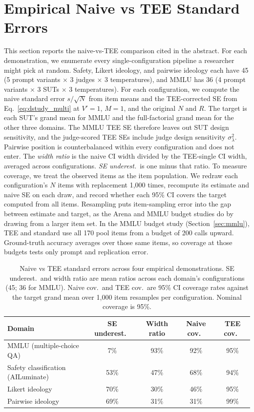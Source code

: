 \clearpage

\section{Empirical Naive vs TEE Standard Errors}
\label{si:naive_vs_tee}

This section reports the naive-vs-TEE comparison cited in the abstract. For each demonstration, we enumerate every single-configuration pipeline a researcher might pick at random. Safety, Likert ideology, and pairwise ideology each have 45 (5 prompt variants $\times$ 3 judges $\times$ 3 temperatures), and MMLU has 36 (4 prompt variants $\times$ 3 SUTs $\times$ 3 temperatures). For each configuration, we compute the naive standard error $s/\sqrt{N}$ from item means and the TEE-corrected SE from Eq.~\ref{eq:dstudy_multi} at $V' = 1$, $M = 1$, and the original $N$ and $R$. The target is each SUT's grand mean for MMLU and the full-factorial grand mean for the other three domains. The MMLU TEE SE therefore leaves out SUT design sensitivity, and the judge-scored TEE SEs include judge design sensitivity $\sigma^2_\lambda$. Pairwise position is counterbalanced within every configuration and does not enter. The \emph{width ratio} is the naive CI width divided by the TEE-single CI width, averaged across configurations. \emph{SE underest.}\ is one minus that ratio. To measure coverage, we treat the observed items as the item population. We redraw each configuration's $N$ items with replacement 1,000 times, recompute its estimate and naive SE on each draw, and record whether each 95\% CI covers the target computed from all items. Resampling puts item-sampling error into the gap between estimate and target, as the Arena and MMLU budget studies do by drawing from a larger item set. In the MMLU budget study (Section~\ref{sec:mmlu}), TEE and standard use all 170 pool items from a budget of 200 calls upward. Ground-truth accuracy averages over those same items, so coverage at those budgets tests only prompt and replication error.

\begin{table}[h]
\centering
\small
\caption{Naive vs TEE standard errors across four empirical demonstrations. SE underest.\ and width ratio are mean ratios across each domain's configurations (45; 36 for MMLU). Naive cov.\ and TEE cov.\ are 95\% CI coverage rates against the target grand mean over 1,000 item resamples per configuration. Nominal coverage is 95\%.}
\label{tab:naive_vs_tee}
\begin{tabular}{lcccc}
\toprule
Domain & SE underest.\ & Width ratio & Naive cov.\ & TEE cov.\ \\
\midrule
MMLU (multiple-choice QA)          & 7\%  & 93\% & 92\% & 95\% \\
Safety classification (AILuminate) & 53\% & 47\% & 68\% & 94\% \\
Likert ideology                    & 70\% & 30\% & 46\% & 95\% \\
Pairwise ideology                  & 69\% & 31\% & 31\% & 99\% \\
\bottomrule
\end{tabular}
\end{table}

